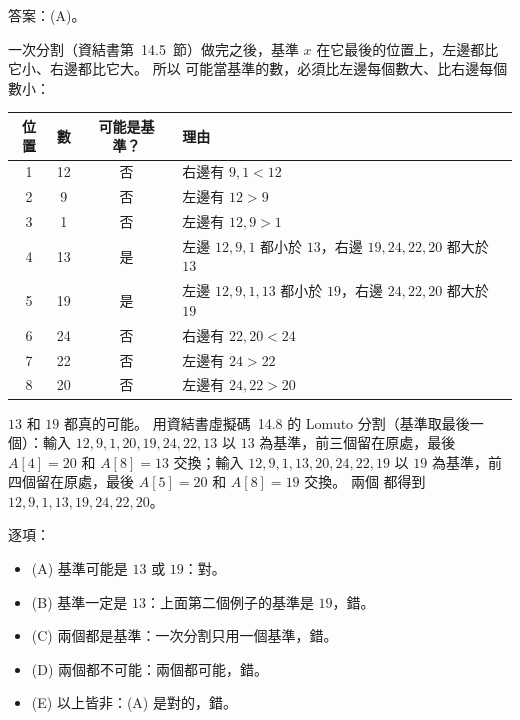 \begin{pastsoln}
答案：(A)。

一次分割（資結書第~14.5~節）做完之後，基準 $x$ 在它最後的位置上，左邊都比它小、右邊都比它大。 所以
可能當基準的數，必須比左邊每個數大、比右邊每個數小：
\begin{center}
\small
\begin{tabular}{cccl}
\toprule
位置 & 數 & 可能是基準？ & 理由 \\
\midrule
1 & 12 & 否 & 右邊有 $9, 1 < 12$ \\
2 & 9 & 否 & 左邊有 $12 > 9$ \\
3 & 1 & 否 & 左邊有 $12, 9 > 1$ \\
4 & 13 & 是 & 左邊 $12, 9, 1$ 都小於 $13$，右邊 $19, 24, 22, 20$ 都大於 $13$ \\
5 & 19 & 是 & 左邊 $12, 9, 1, 13$ 都小於 $19$，右邊 $24, 22, 20$ 都大於 $19$ \\
6 & 24 & 否 & 右邊有 $22, 20 < 24$ \\
7 & 22 & 否 & 左邊有 $24 > 22$ \\
8 & 20 & 否 & 左邊有 $24, 22 > 20$ \\
\bottomrule
\end{tabular}
\end{center}

$13$ 和 $19$ 都真的可能。 用資結書虛擬碼~14.8 的 Lomuto 分割（基準取最後一個）：輸入
$12, 9, 1, 20, 19, 24, 22, 13$ 以 $13$ 為基準，前三個留在原處，最後 $A[4] = 20$ 和 $A[8] = 13$ 交換；輸入
$12, 9, 1, 13, 20, 24, 22, 19$ 以 $19$ 為基準，前四個留在原處，最後 $A[5] = 20$ 和 $A[8] = 19$ 交換。 兩個
都得到 $12, 9, 1, 13, 19, 24, 22, 20$。

逐項：
\begin{itemize}
\item (A) 基準可能是 $13$ 或 $19$：對。
\item (B) 基準一定是 $13$：上面第二個例子的基準是 $19$，錯。
\item (C) 兩個都是基準：一次分割只用一個基準，錯。
\item (D) 兩個都不可能：兩個都可能，錯。
\item (E) 以上皆非：(A) 是對的，錯。
\end{itemize}
\end{pastsoln}
